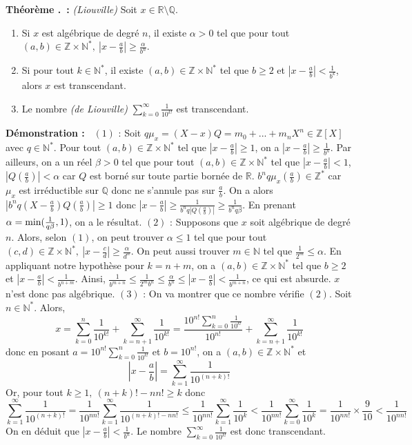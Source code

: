 \documentclass[5pt,a4paper]{article}
\newcounter{thmcounter}[subsection]
\renewcommand{\thethmcounter}{\thesubsection.\arabic{thmcounter}}
\newcommand{\thmEnum}[1]{
    \stepcounter{thmcounter}
    \hypertarget{t:\thethmcounter}{}%
    \noindent\textbf{Théorème \thethmcounter ~:} #1
}
\newcommand{\demo}[1]{
    \textbf{Démonstration :~} #1 \newline
}
\begin{document}
\begin{onehalfspacing}
\thmEnum{\textit{(Liouville)} Soit $x \in \mathbb{R} \setminus \mathbb{Q}$. 
	\begin{enumerate}
	\item Si $x$ est algébrique de degré $n$, il existe $\alpha > 0$ tel que pour tout $(a,b) \in \mathbb{Z} \times \mathbb{N}^*,~|x - \frac{a}{b}| \geq \frac{\alpha}{b^n}$.
	\item Si pour tout $k \in \mathbb{N}^*$, il existe $(a,b) \in \mathbb{Z} \times \mathbb{N}^*$ tel que $b \geq 2$ et $|x - \frac{a}{b}| < \frac{1}{b^k}$, alors $x$ est transcendant.
	\item Le nombre \textit{(de Liouville)} $\sum_{k=0}^{\infty} \frac{1}{10^{k!}}$ est transcendant.
	\end{enumerate}
}
\demo{$(1)$ : Soit $q\mu_x = (X - x)Q = m_0 + ... + m_nX^n \in \mathbb{Z}[X]$ avec $q \in \mathbb{N}^*$. Pour tout $(a,b) \in \mathbb{Z} \times \mathbb{N}^*$ tel que $|x - \frac{a}{b}| \geq 1$, on a $|x - \frac{a}{b}| \geq \frac{1}{b^n}$. Par ailleurs, on a un réel $\beta > 0$ tel que pour tout $(a,b) \in \mathbb{Z} \times \mathbb{N}^*$ tel que $|x - \frac{a}{b}| < 1$, $|Q(\frac{a}{b})| < \alpha$ car $Q$ est borné sur toute partie bornée de $\mathbb{R}$. $b^nq\mu_x(\frac{a}{b}) \in \mathbb{Z}^*$ car $\mu_x$ est irréductible sur $\mathbb{Q}$ donc ne s'annule pas sur $\frac{a}{b}$. On a alors $|b^nq(X - \frac{a}{b})Q(\frac{a}{b})| \geq 1$ donc $|x - \frac{a}{b}| \geq \frac{1}{b^nq|Q(\frac{a}{b})|} \geq  \frac{1}{b^nq\beta}$. En prenant $\alpha = \textup{min}(\frac{1}{q\beta}, 1)$, on a le résultat. $(2)$ : Supposons que $x$ soit algébrique de degré $n$. Alors, selon $(1)$, on peut trouver $\alpha \leq 1$ tel que pour tout $(c,d) \in \mathbb{Z} \times \mathbb{N}^*,~|x - \frac{c}{d}| \geq \frac{\alpha}{d^n}$. On peut aussi trouver $m \in \mathbb{N}$ tel que $\frac{1}{2^m} \leq \alpha$. En appliquant notre hypothèse pour $k = n+m$, on a $(a,b) \in \mathbb{Z} \times \mathbb{N}^*$ tel que $b \geq 2$ et $|x - \frac{a}{b}| < \frac{1}{b^{n+m}}$. Ainsi, $\frac{1}{b^{m+n}} \leq \frac{1}{2^mb^n} \leq \frac{\alpha}{b^n} \leq |x - \frac{a}{b}| < \frac{1}{b^{m+n}}$, ce qui est absurde. $x$ n'est donc pas algébrique. $(3)$ : On va montrer que ce nombre vérifie $(2)$. Soit $n \in \mathbb{N}^*$. Alors,
\[x = \sum_{k=0}^n \frac{1}{10^{k!}} + \sum_{k=n+1}^\infty \frac{1}{10^{k!}} = \frac{10^{n!}\sum_{k=0}^n \frac{1}{10^{k!}}}{10^{n!}} + \sum_{k=n+1}^\infty \frac{1}{10^{k!}}\]
donc en posant $a = 10^{n!}\sum_{k=0}^n \frac{1}{10^{k!}}$ et $b = 10^{n!}$, on a $(a,b) \in \mathbb{Z}\times \mathbb{N}^*$ et
\[|x - \frac{a}{b}| = \sum_{k=1}^\infty \frac{1}{10^{(n+k)!}}\]
Or, pour tout $k \geq 1,~(n+k)! - nn! \geq k$ donc
\[\sum_{k=1}^\infty \frac{1}{10^{(n+k)!}} = \frac{1}{10^{nn!}}\sum_{k=1}^\infty \frac{1}{10^{(n+k)! - nn!}} \leq \frac{1}{10^{nn!}}\sum_{k=1}^\infty \frac{1}{10^k} < \frac{1}{10^{nn!}}\sum_{k=0}^\infty \frac{1}{10^k} = \frac{1}{10^{nn!}} \times \frac{9}{10} < \frac{1}{10^{nn!}}\]
On en déduit que $|x - \frac{a}{b}| < \frac{1}{b^n}$. Le nombre $\sum_{k=0}^{\infty} \frac{1}{10^{k!}}$ est donc transcendant.
}


\end{onehalfspacing}
\end{document}
